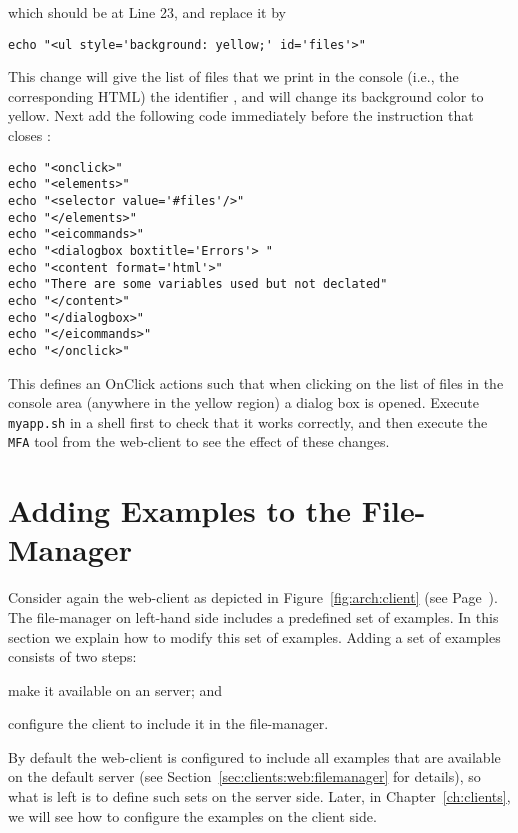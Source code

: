 \medskip
\noindent
which should be at Line 23, and replace it by

\medskip
\begin{lstlisting}[style=script]
echo "<ul style='background: yellow;' id='files'>"
\end{lstlisting}

\medskip
\noindent
This change will give the list of files that we print in the console
(i.e., the corresponding HTML) the identifier , and will
change its background color to yellow. Next add the following code
immediately before the instruction that closes :

\medskip
\begin{lstlisting}[style=script]
echo "<onclick>"
echo "<elements>"
echo "<selector value='#files'/>"
echo "</elements>"
echo "<eicommands>"
echo "<dialogbox boxtitle='Errors'> "
echo "<content format='html'>"
echo "There are some variables used but not declated"
echo "</content>"
echo "</dialogbox>"
echo "</eicommands>"
echo "</onclick>"
\end{lstlisting}

\medskip
\noindent
This defines an OnClick actions such that when clicking on the list of
files in the console area (anywhere in the yellow region) a dialog box
is opened. Execute \texttt{myapp.sh} in a shell first to check that it
works correctly, and then execute the \texttt{MFA} tool from the
web-client to see the effect of these changes.

\section{Adding Examples to the File-Manager}

Consider again the web-client as depicted in
Figure~\ref{fig:arch:client} (see Page~\pageref{fig:arch:client}). The
file-manager on left-hand side includes a predefined set of
examples. In this section we explain how to modify this set of
examples.
%
Adding a set of examples consists of two steps:
%
\begin{inparaenum}
\item make it available on an \ei server; and
\item configure the client to include it in the file-manager.
\end{inparaenum}
%
By default the web-client is configured to include all examples that
are available on the default server (see
Section~\ref{sec:clients:web:filemanager} for details), so what is
left is to define such sets on the server side. Later, in
Chapter~\ref{ch:clients}, we will see how to configure the examples on
the client side.

